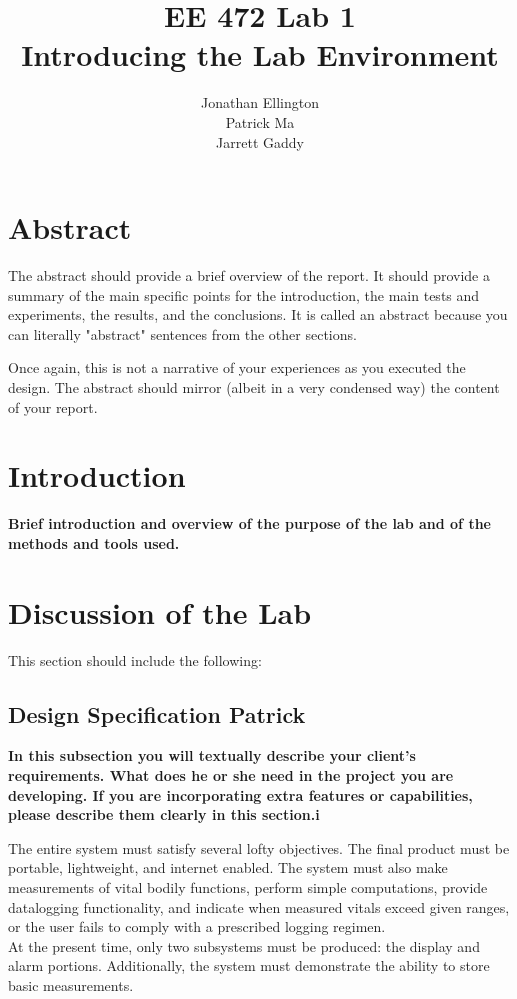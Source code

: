 \documentclass[12pt]{article} %
\title{\TitleFont EE 472 Lab 1 \\ Introducing the Lab Environment \vfill }
\author{\AuthorFont Jonathan Ellington \\ Patrick Ma \\ Jarrett Gaddy}
\date{}
\begin{document}
\maketitle
\thispagestyle{empty}
\pagebreak
\tableofcontents
\listoftables
\listoffigures
\thispagestyle{empty}
\pagebreak
\setcounter{page}{1}

\section{Abstract}
The abstract should provide a brief overview of the report.  It should provide a summary of the main specific points for the introduction, the main tests and experiments, the results, and the conclusions. It is called an abstract because you can literally "abstract" sentences from the other sections. 

Once again, this is not a narrative of your experiences as you executed the design.  The abstract should mirror (albeit in a very condensed way) the content of your report.

\section{Introduction}
\textbf{Brief introduction and overview of the purpose of the lab and of the methods and tools used.}

\section{Discussion of the Lab}

This section should include the following:

\subsection{Design Specification  Patrick}

\textbf{In this subsection you will textually describe your client's requirements.  What does he or she need in the project you are developing.  If you are incorporating extra features or capabilities, please describe them clearly in this section.i}

The entire system must satisfy several lofty objectives. The final product must be portable, lightweight, and internet enabled. The system must also make measurements of vital bodily functions, perform simple computations, provide datalogging functionality, and indicate when measured vitals exceed given ranges, or the user fails to comply with a prescribed logging regimen. \\
At the present time, only two subsystems must be produced: the display and alarm portions. Additionally, the system must demonstrate the ability to store basic measurements. \\
\end{document}
